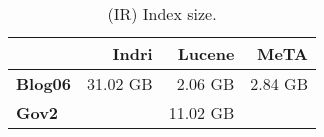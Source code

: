 \begin{table}[t]
\centering
{\small
\begin{tabular}{|l|r|r|r|}
    \hline & \textbf{Indri} & \textbf{Lucene} & \textbf{MeTA} \\
    \hline
    \textbf{Blog06} & 31.02 GB & 2.06 GB & 2.84 GB \\
    \textbf{Gov2} & & 11.02 GB & \\
    \hline
\end{tabular}
\caption{(IR) Index size.}
\label{table:ir-index-size}
}
\end{table}
